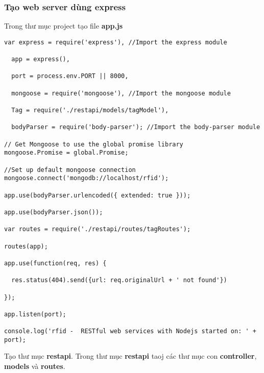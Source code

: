 \subsubsection{Tạo web server dùng express}
Trong thư mục project tạo file \textbf{app.js} 
\begin{lstlisting}
var express = require('express'), //Import the express module

  app = express(),

  port = process.env.PORT || 8000,

  mongoose = require('mongoose'), //Import the mongoose module

  Tag = require('./restapi/models/tagModel'),

  bodyParser = require('body-parser'); //Import the body-parser module
  
// Get Mongoose to use the global promise library
mongoose.Promise = global.Promise;

//Set up default mongoose connection
mongoose.connect('mongodb://localhost/rfid');

app.use(bodyParser.urlencoded({ extended: true }));

app.use(bodyParser.json());

var routes = require('./restapi/routes/tagRoutes');

routes(app);

app.use(function(req, res) {

  res.status(404).send({url: req.originalUrl + ' not found'})

});

app.listen(port);

console.log('rfid -  RESTful web services with Nodejs started on: ' + port);
\end{lstlisting}
Tạo thư mục \textbf{restapi}. Trong thư mục \textbf{restapi} taoj các thư mục con \textbf{controller}, \textbf{models} và \textbf{routes}.
